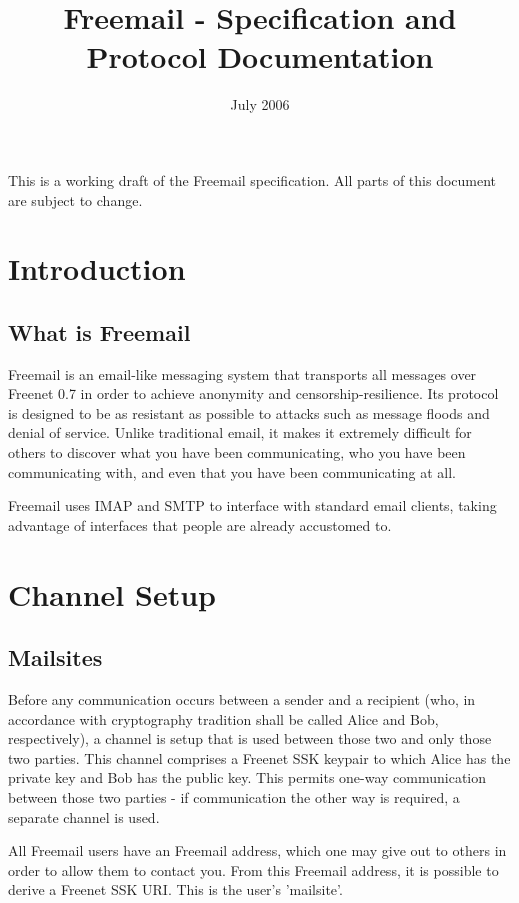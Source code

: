 \documentclass[12pt,a4paper]{article}
\begin{document}
\title{Freemail - Specification and Protocol Documentation}
\date{July 2006}
\maketitle

This is a working draft of the Freemail specification. All parts of this document are subject to
change.

\section{Introduction}
\subsection{What is Freemail}
Freemail is an email-like messaging system that transports all messages over Freenet 0.7 in order to
achieve anonymity and censorship-resilience. Its protocol is designed to be as resistant as possible
to attacks such as message floods and denial of service. Unlike traditional email, it makes it
extremely difficult for others to discover what you have been communicating, who you have been
communicating with, and even that you have been communicating at all.

Freemail uses IMAP and SMTP to interface with standard email clients, taking advantage of interfaces
that people are already accustomed to.

\section{Channel Setup}
\subsection{Mailsites}
Before any communication occurs between a sender and a recipient (who, in accordance with
cryptography tradition shall be called Alice and Bob, respectively), a channel is setup that is used
between those two and only those two parties. This channel comprises a Freenet SSK keypair to which
Alice has the private key and Bob has the public key. This permits one-way communication between
those two parties - if communication the other way is required, a separate channel is used.

All Freemail users have an Freemail address, which one may give out to others in order to allow them
to contact you. From this Freemail address, it is possible to derive a Freenet SSK URI. This is the
user's 'mailsite'.
\end{document}
